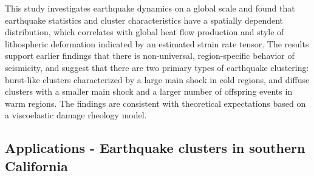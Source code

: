 \documentclass[12pt]{article} %
\theoremstyle{plain}
\begin{document}
	This study investigates earthquake dynamics on a global scale and found that earthquake statistics and cluster characteristics have a spatially dependent distribution, which correlates with global heat flow production and style of lithospheric deformation indicated by an estimated strain rate tensor. The results support earlier findings that there is non-universal, region-specific behavior of seismicity, and suggest that there are two primary types of earthquake clustering: burst-like clusters characterized by a large main shock in cold regions, and diffuse clusters with a smaller main shock and a larger number of offspring events in warm regions. The findings are consistent with theoretical expectations based on a viscoelastic damage rheology model.
	
	\subsection{Applications - Earthquake clusters in southern California }
	
\end{document}
